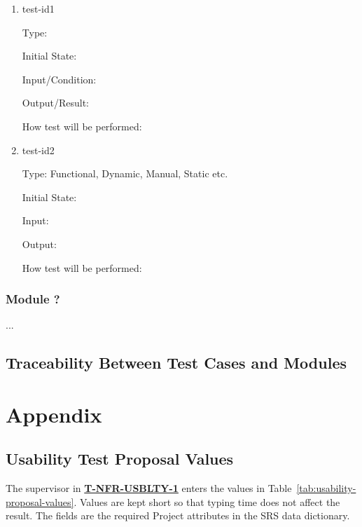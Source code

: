 \documentclass[12pt, titlepage]{article}
\begin{document}
\begin{enumerate}

\item{test-id1\\}

Type: 
					
Initial State: 
					
Input/Condition: 
					
Output/Result: 
					
How test will be performed: 
					
\item{test-id2\\}

Type: Functional, Dynamic, Manual, Static etc.
					
Initial State: 
					
Input: 
					
Output: 
					
How test will be performed: 

\end{enumerate}

\subsubsection{Module ?}

...

\subsection{Traceability Between Test Cases and Modules}

				




\newpage

\section{Appendix}

\subsection{Usability Test Proposal Values}
\label{app:usability-proposal-values}

The supervisor in \hyperref[T-NFR-USBLTY-1]{\textbf{T-NFR-USBLTY-1}} enters the values in
Table~\ref{tab:usability-proposal-values}. Values are kept short so that typing
time does not affect the result. The fields are the required
Project attributes in the SRS data dictionary.
\end{document}
